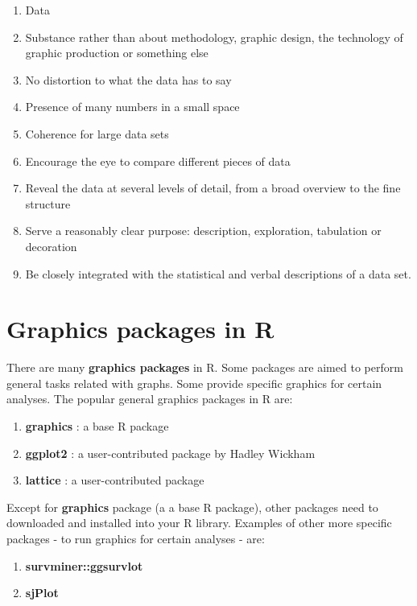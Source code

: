 \documentclass[
]{book}
\providecommand{\tightlist}{%
  \setlength{\itemsep}{0pt}\setlength{\parskip}{0pt}}
\begin{document}
\begin{enumerate}
\def\labelenumi{\arabic{enumi}.}
\tightlist
\item
  Data
\item
  Substance rather than about methodology, graphic design, the technology of graphic production or something else
\item
  No distortion to what the data has to say
\item
  Presence of many numbers in a small space
\item
  Coherence for large data sets
\item
  Encourage the eye to compare different pieces of data
\item
  Reveal the data at several levels of detail, from a broad overview to the fine structure
\item
  Serve a reasonably clear purpose: description, exploration, tabulation or decoration
\item
  Be closely integrated with the statistical and verbal descriptions of a data set.
\end{enumerate}

\hypertarget{graphics-packages-in-r}{%
\section{Graphics packages in R}\label{graphics-packages-in-r}}

There are many \textbf{graphics packages} in R. Some packages are aimed to perform general tasks related with graphs. Some provide specific graphics for certain analyses. The popular general graphics packages in R are:

\begin{enumerate}
\def\labelenumi{\arabic{enumi}.}
\tightlist
\item
  \textbf{graphics} : a base R package
\item
  \textbf{ggplot2} : a user-contributed package by Hadley Wickham
\item
  \textbf{lattice} : a user-contributed package
\end{enumerate}

Except for \textbf{graphics} package (a a base R package), other packages need to downloaded and installed into your R library. Examples of other more specific packages - to run graphics for certain analyses - are:

\begin{enumerate}
\def\labelenumi{\arabic{enumi}.}
\tightlist
\item
  \textbf{survminer::ggsurvlot}
\item
  \textbf{sjPlot}
\end{enumerate}
\end{document}
